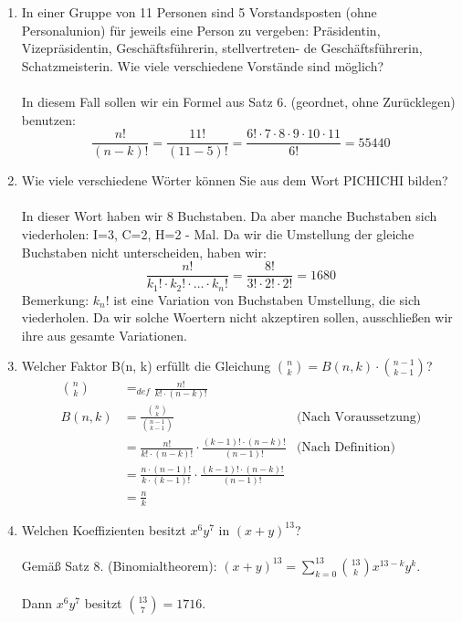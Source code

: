 \begin{enumerate}[label=(\alph*)]
        \item In einer Gruppe von 11 Personen sind 5 Vorstandsposten (ohne Personalunion) für jeweils
        eine Person zu vergeben: Präsidentin, Vizepräsidentin, Geschäftsführerin, stellvertreten-
        de Geschäftsführerin, Schatzmeisterin. Wie viele verschiedene Vorstände sind möglich?\\\\
        In diesem Fall sollen wir ein Formel aus Satz 6. (geordnet, ohne Zur\"ucklegen) benutzen:
        \[\frac{n!}{(n-k)!}=\frac{11!}{(11-5)!}
        =\frac{6!\cdot7\cdot8\cdot9\cdot10\cdot11}{6!}
        =55440\]

        \item Wie viele verschiedene Wörter können Sie aus dem Wort PICHICHI bilden?\\\\
        In dieser Wort haben wir 8 Buchstaben. Da aber manche Buchstaben sich viederholen: 
        I=3, C=2, H=2 - Mal. Da wir die Umstellung der gleiche Buchstaben nicht unterscheiden, haben wir:
        \[\frac{n!}{k_1!\cdot k_2!\cdot\ldots\cdot k_n!} = \frac{8!}{3!\cdot2!\cdot2!} = 1680\]
        Bemerkung: $k_n!$ ist eine Variation von Buchstaben Umstellung, die sich viederholen. 
        Da wir solche Woertern nicht akzeptiren sollen, ausschließen wir ihre aus gesamte Variationen. 

        \item Welcher Faktor B(n, k) erfüllt die Gleichung $\binom{n}{k} = B(n,k)\cdot\binom{n-1}{k-1}$?
        \begin{align*}
        \binom{n}{k} &=_{def} \frac{n!}{k!\cdot(n-k)!}\\
        B(n,k) &= \frac{\binom{n}{k}}{\binom{n-1}{k-1}} &\textrm{(Nach Voraussetzung)}\\
        &= \frac{n!}{k!\cdot(n-k)!} \cdot \frac{(k-1)!\cdot(n-k)!}{(n-1)!} &\textrm{(Nach Definition)}\\
        &= \frac{n\cdot(n-1)!}{k\cdot(k-1)!} \cdot \frac{(k-1)!\cdot(n-k)!}{(n-1)!}\\
        &= \frac{n}{k}
        \end{align*}
        
        \item Welchen Koeffizienten besitzt $x^6y^7$ in $(x+y)^{13}$?\\\\
        Gemäß Satz 8. (Binomialtheorem): $(x+y)^{13} = \sum_{k=0}^{13} \binom{13}{k}x^{13-k}y^k$.\\\\
        Dann $x^6y^7$ besitzt $\binom{13}{7} = 1716$.


\end{enumerate}
